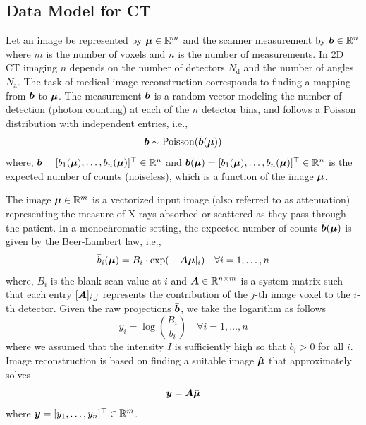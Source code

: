 
\subsection{Data Model for CT}
Let an image be represented by $\bm{\mu} \in \mathbb{R}^m$ and the scanner measurement by $\bm{b} \in \mathbb{R}^n$ where $m$ is the number of voxels and $n$ is the number of measurements. In \ac{2D} \ac{CT} imaging $n$ depends on the number of detectors $N_\mathrm{d}$ and the number of angles $N_\mathrm{a}$. The task of medical image reconstruction corresponds to finding a mapping from $\bm{b}$ to $\bm{\mu}$. The measurement $\bm{b}$ is a random vector modeling the number of detection (photon counting) at each of the $n$ detector bins, and follows a Poisson distribution with independent entries, i.e.,
\begin{equation}\label{eq:pCT}
\bm{b} \sim \mathrm{Poisson}(\bar{\bm{b}}(\bm{\mu}))
\end{equation}    
where, $\bm{b}  =  [b_1(\bm{\mu}),\dots,b_n(\bm{\mu})]^\top\in \mathbb{R}^n$ and $\bar{\bm{b}}(\bm{\mu})  =  [\bar{b}_1(\bm{\mu}),\dots,\bar{b}_n(\bm{\mu})]^\top\in \mathbb{R}^n$ is the expected number of counts (noiseless), which is a function of the image $\bm{\mu}$. 

The image $\bm{\mu}\in\mathbb{R}^m$ is a vectorized input image (also referred to as attenuation) representing the measure of X-rays absorbed or scattered as they pass through the patient. In a monochromatic setting, the expected number of counts $\bar{\bm{b}}(\bm{\mu})$  is given by the Beer-Lambert law, i.e.,
\begin{equation}\label{eq:CT}
\bar{b}_i(\bm{\mu}) = B_i \cdot \exp (-[\bm{A} \bm{\mu}]_i) \quad \forall i=1,\dots,n 
\end{equation}
where, $B_i$ is the blank scan value at $i$ and $\bm{A} \in \mathbb{R}^{n\times m}$ is a system matrix such that each entry $[\bm{A}]_{i,j}$ represents the contribution of the $j$-th image voxel to the $i$-th detector. Given the raw projections $\bar{\bm{b}}$, we take the logarithm as follows
\begin{equation}
y_i = \log\left(\frac{B_i}{b_i}\right) \quad \forall i=1,\dots,n   
\end{equation}
where we assumed that the intensity $I$ is sufficiently high so that $b_i>0$ for all $i$. Image reconstruction is based on finding a suitable image $\bm{\hat{\mu}}$ that approximately solves 
\begin{equation}\label{eq:pb2solve}
\bm{y} = \bm{A} \bm{\hat{\mu}} 
\end{equation} 
where $\bm{y}  =  [y_1,\dots,y_n]^\top\in \mathbb{R}^m$. 

